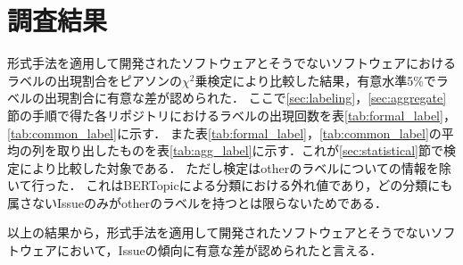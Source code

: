 \documentclass[main]{subfiles}
\begin{document}
\chapter{調査結果}

形式手法を適用して開発されたソフトウェアとそうでないソフトウェアにおけるラベルの出現割合をピアソンの\(\chi^2\)乗検定により比較した結果，有意水準5\%でラベルの出現割合に有意な差が認められた．
ここで\ref{sec:labeling}，\ref{sec:aggregate}節の手順で得た各リポジトリにおけるラベルの出現回数を表\ref{tab:formal_label}，\ref{tab:common_label}に示す．
また表\ref{tab:formal_label}，\ref{tab:common_label}の平均の列を取り出したものを表\ref{tab:agg_label}に示す．これが\ref{sec:statistical}節で検定により比較した対象である．
ただし検定はotherのラベルについての情報を除いて行った．
これはBERTopicによる分類における外れ値であり，どの分類にも属さないIssueのみがotherのラベルを持つとは限らないためである．

以上の結果から，形式手法を適用して開発されたソフトウェアとそうでないソフトウェアにおいて，Issueの傾向に有意な差が認められたと言える．


\end{document}
